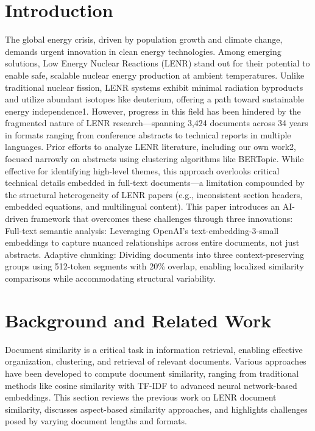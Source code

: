 \documentclass[12pt]{article}
\begin{document}
\section{Introduction}
The global energy crisis, driven by population growth and climate change, demands urgent innovation in clean energy technologies. Among emerging solutions, Low Energy Nuclear Reactions (LENR) stand out for their potential to enable safe, scalable nuclear energy production at ambient temperatures. Unlike traditional nuclear fission, LENR systems exhibit minimal radiation byproducts and utilize abundant isotopes like deuterium, offering a path toward sustainable energy independence1. However, progress in this field has been hindered by the fragmented nature of LENR research—spanning 3,424 documents across 34 years in formats ranging from conference abstracts to technical reports in multiple languages.
Prior efforts to analyze LENR literature, including our own work2, focused narrowly on abstracts using clustering algorithms like BERTopic. While effective for identifying high-level themes, this approach overlooks critical technical details embedded in full-text documents—a limitation compounded by the structural heterogeneity of LENR papers (e.g., inconsistent section headers, embedded equations, and multilingual content).
This paper introduces an AI-driven framework that overcomes these challenges through three innovations:
Full-text semantic analysis: Leveraging OpenAI’s text-embedding-3-small embeddings to capture nuanced relationships across entire documents, not just abstracts.
Adaptive chunking: Dividing documents into three context-preserving groups using 512-token segments with 20\% overlap, enabling localized similarity comparisons while accommodating structural variability.
    
    \section{Background and Related Work}

    Document similarity is a critical task in information retrieval, enabling effective organization, clustering, and retrieval of relevant documents. Various approaches have been developed to compute document similarity, ranging from traditional methods like cosine similarity with TF-IDF to advanced neural network-based embeddings. This section reviews the previous work on LENR document similarity, discusses aspect-based similarity approaches, and highlights challenges posed by varying document lengths and formats.
    
\end{document}
